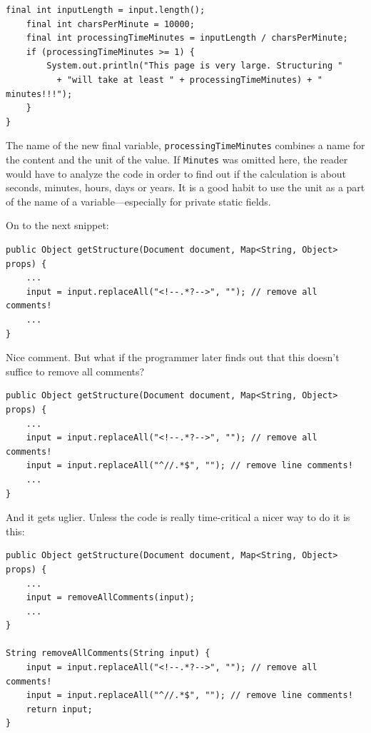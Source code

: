 \documentclass[12pt]{book}
\begin{document}
\begin{lstlisting}[caption=selfdoc2c.java] 
    final int inputLength = input.length();
    final int charsPerMinute = 10000;
    final int processingTimeMinutes = inputLength / charsPerMinute;
    if (processingTimeMinutes >= 1) {
        System.out.println("This page is very large. Structuring "
          + "will take at least " + processingTimeMinutes) + " minutes!!!");
    }
}
\end{lstlisting}

The name of the new final variable, {\tt processingTimeMinutes} combines a name for the content and the unit of the value. If {\tt Minutes} was omitted here, the reader would have to analyze the code in order to find out if the calculation is about seconds, minutes, hours, days or years. It is a good habit to use the unit as a part of the name of a variable---especially for private static fields.

On to the next snippet:

\begin{lstlisting}[caption=selfdoc3a.java] 
public Object getStructure(Document document, Map<String, Object> props) {
    ...
    input = input.replaceAll("<!--.*?-->", ""); // remove all comments!
    ...
}
\end{lstlisting}

Nice comment. But what if the programmer later finds out that this doesn't suffice to remove all comments?


\begin{lstlisting}[caption=selfdoc3b.java] 
public Object getStructure(Document document, Map<String, Object> props) {
    ...
    input = input.replaceAll("<!--.*?-->", ""); // remove all comments!
    input = input.replaceAll("^//.*$", ""); // remove line comments!
    ...
}
\end{lstlisting}

And it gets uglier. Unless the code is really time-critical a nicer way to do it is this:

\begin{lstlisting}[caption=selfdoc3c.java] 
public Object getStructure(Document document, Map<String, Object> props) {
    ...
    input = removeAllComments(input);
    ...
}

String removeAllComments(String input) {
    input = input.replaceAll("<!--.*?-->", ""); // remove all comments!
    input = input.replaceAll("^//.*$", ""); // remove line comments!
    return input;
}
\end{lstlisting}
\end{document}
